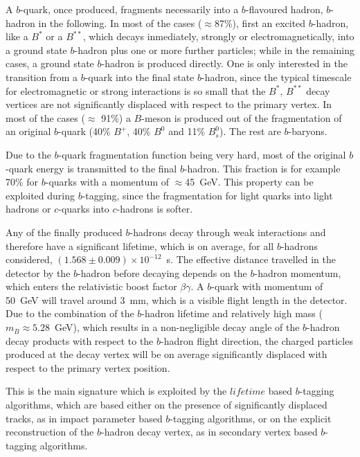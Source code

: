\begin{itemize}
A $b$-quark, once produced, fragments necessarily into a $b$-flavoured hadron, $b$-hadron in the following. In most of the cases ($\approx$87\%), first an excited $b$-hadron, like a $B^{*}$ or a $B^{**}$, which decays inmediately, strongly or electromagnetically, into a ground state $b$-hadron plus one or more further particles; while in the remaining cases, a ground state $b$-hadron is produced directly.  One is only interested in the transition from a $b$-quark into the final state $b$-hadron, since the typical timescale for electromagnetic or strong interactions is so small that the  $B^{*}$, $B^{**}$ decay vertices are not significantly displaced with respect to the primary vertex.   In most of the cases ($\approx$ 91\%) a $B$-meson is produced out of the fragmentation of an original $b$-quark (40\% $B^+$, 40\% $B^0$ and 11\% $B^0_s$). The rest are $b$-baryons.

Due to the $b$-quark fragmentation function being very hard, most of the original $b$-quark energy is transmitted to the final $b$-hadron. This fraction is for example 70\% for $b$-quarks with a momentum of $\approx$45~GeV. This property can be exploited during $b$-tagging, since the fragmentation for light quarks into light hadrons or $c$-quarks into $c$-hadrons is softer.

Any of the finally produced $b$-hadrons decay through weak interactions and therefore have a significant lifetime, which is on average, for all $b$-hadrons considered, $(1.568\pm0.009) \times 10^{-12}$~s.  The effective distance travelled in the detector by the $b$-hadron before decaying depends on the $b$-hadron momentum, which enters the relativistic boost factor $\beta\gamma$. A $b$-quark with momentum of 50~GeV will travel around 3~mm, which is a visible flight length in the detector. Due to the combination of the $b$-hadron lifetime and relatively high mass ($m_B \approx 5.28$~GeV), which results in a non-negligible decay angle of the $b$-hadron decay products %
with respect to the $b$-hadron flight direction, the charged particles produced at the decay vertex will be on average significantly displaced with respect to the primary vertex position.

This is the main signature which is exploited by the $lifetime$ based $b$-tagging algorithms, which are based either on the presence of significantly displaced tracks, as in impact parameter based $b$-tagging algorithms, or on the explicit reconstruction of the $b$-hadron decay vertex, as in secondary vertex based $b$-tagging algorithms.



\end{itemize}
